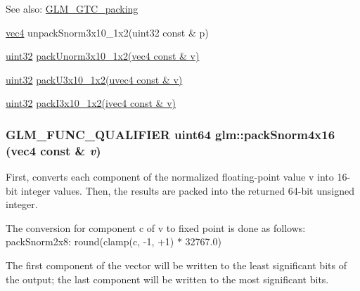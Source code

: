 \begin{Desc}
\item[See also:]\hyperlink{group__gtc__packing}{GLM\_\-GTC\_\-packing} 

\hyperlink{group__core__types_g5881b1b022d7fd1b7218f5916532dd02}{vec4} unpackSnorm3x10\_\-1x2(uint32 const \& p) 

\hyperlink{group__gtc__type__precision_g202b6a53c105fcb7e531f9b443518451}{uint32} \hyperlink{group__gtc__packing_g2cf2d11b40bd48639110456fd74c2e33}{packUnorm3x10\_\-1x2(vec4 const \& v)} 

\hyperlink{group__gtc__type__precision_g202b6a53c105fcb7e531f9b443518451}{uint32} \hyperlink{group__gtc__packing_gf656d8862628f96b20de7a36eaa1fe56}{packU3x10\_\-1x2(uvec4 const \& v)} 

\hyperlink{group__gtc__type__precision_g202b6a53c105fcb7e531f9b443518451}{uint32} \hyperlink{group__gtc__packing_g032e18fa5bc5b8f3897104aeb2f1e195}{packI3x10\_\-1x2(ivec4 const \& v)} \end{Desc}
\hypertarget{group__gtc__packing_g9b237d7c66b7a71964e6d1f4dc06539f}{
\subsubsection[packSnorm4x16]{\setlength{\rightskip}{0pt plus 5cm}GLM\_\-FUNC\_\-QUALIFIER uint64 glm::packSnorm4x16 (vec4 const \& {\em v})}}
\label{group__gtc__packing_g9b237d7c66b7a71964e6d1f4dc06539f}


First, converts each component of the normalized floating-point value v into 16-bit integer values. Then, the results are packed into the returned 64-bit unsigned integer.

The conversion for component c of v to fixed point is done as follows: packSnorm2x8: round(clamp(c, -1, +1) $\ast$ 32767.0)

The first component of the vector will be written to the least significant bits of the output; the last component will be written to the most significant bits.

